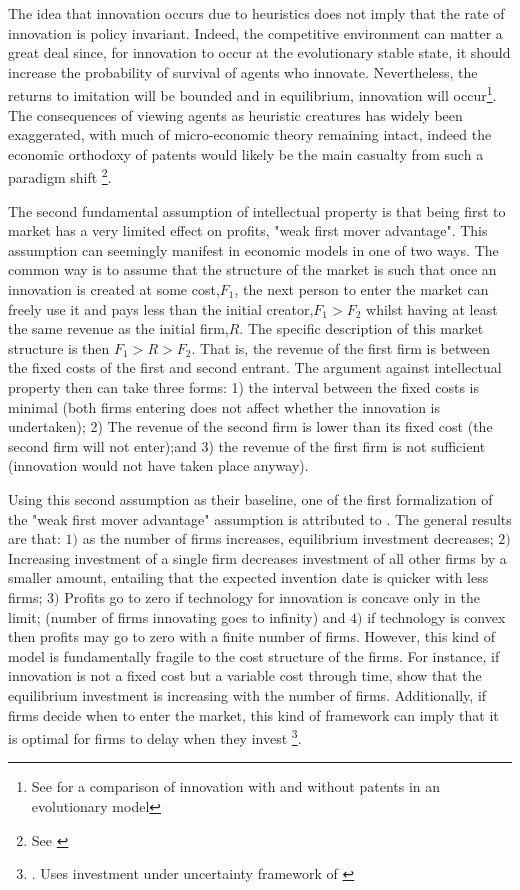The idea that innovation occurs due to heuristics does not imply that the rate of innovation is policy invariant. Indeed, the competitive environment can matter a great deal since, for innovation to occur at the evolutionary stable state, it should increase the probability of survival of agents who innovate. Nevertheless, the returns to imitation will be bounded and in equilibrium, innovation will occur\footnote{See \cite{Winter1993} for a comparison of innovation with and without patents in an evolutionary model}. The consequences of viewing agents as heuristic creatures has widely been exaggerated, with much of micro-economic theory remaining intact, indeed the economic orthodoxy of patents would likely be the main casualty from such a paradigm shift \footnote{See \cite{becker1962irrational}}.



The second fundamental assumption of intellectual property is that being first to market has a very limited effect on profits, "weak first mover advantage". This assumption can seemingly manifest in economic models in one of two ways. The common way is to assume that the structure of the market is such that once an innovation is created at some cost,$F_1$, the next person to enter the market can freely use it and pays less than the initial creator,$F_1>F_2$ whilst having at least the same revenue as the initial firm,$R$. The specific description of this market structure is then $F_1>R>F_2$. That is, the revenue of the first firm is between the fixed costs of the first and second entrant. The argument against intellectual property then can take three forms: 1) the interval between the fixed costs is minimal (both firms entering does not affect whether the innovation is undertaken); 2) The revenue of the second firm is lower than its fixed cost (the second firm will not enter);and 3) the revenue of the first firm is not sufficient (innovation would not have taken place anyway).

Using this second assumption as their baseline, one of the first formalization of the "weak first mover advantage" assumption is attributed to \cite{loury_1979}. The general results are that: $1)$ as the number of firms increases, equilibrium investment decreases; $2)$ Increasing investment of a single firm decreases investment of all other firms by a smaller amount, entailing that the expected invention date is quicker with less firms; $3)$ Profits go to zero if technology for innovation is concave only in the limit; (number of firms innovating goes to infinity) and $4)$ if technology is convex then profits may go to zero with a finite number of firms. However, this kind of model is fundamentally fragile to the cost structure of the firms. For instance, if innovation is not a fixed cost but a variable cost through time, \cite{lee1980market} show that the equilibrium investment is increasing with the number of firms. Additionally, if firms decide when to enter the market, this kind of framework can imply that it is optimal for firms to delay when they invest \footnote{\cite{Weeds2002}. Uses investment under uncertainty framework of \cite{DixitPindyck1994}}.

